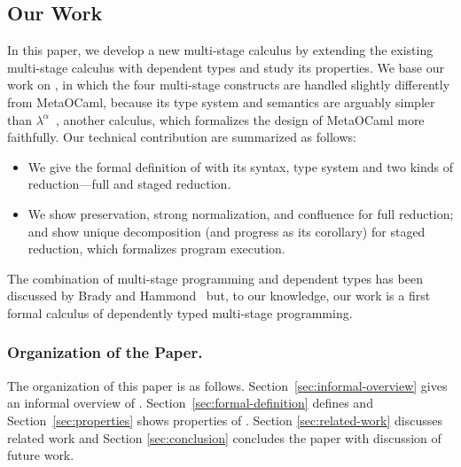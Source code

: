 \subsection{Our Work}
In this paper, we develop a new multi-stage calculus \LMD by extending
the existing multi-stage calculus \LTP\cite{Hanada2014} with dependent
types and study its properties.  We base our work on \LTP, in which
the four multi-stage constructs are handled slightly differently from
MetaOCaml, because its type system and semantics are arguably simpler
than \(\lambda^\alpha\)~\cite{taha2003environment}, another calculus,
which formalizes the design of MetaOCaml more faithfully.  Our
technical contribution are summarized as follows:
\begin{itemize}
\item We give the formal definition of \LMD with its syntax, 
  type system and two kinds of reduction---full and staged reduction.
\item We show preservation, strong normalization, and confluence for
  full reduction; and show unique decomposition (and progress as its
  corollary) for staged reduction, which formalizes program execution.
\end{itemize}
The combination of multi-stage programming and dependent types has
been discussed by Brady and Hammond~\cite{brady2006dependently} but,
to our knowledge, our work is a first formal calculus of dependently
typed multi-stage programming.


\subsubsection{Organization of the Paper.}

The organization of this paper is as follows.
Section~\ref{sec:informal-overview} gives an informal overview of
\LMD.  Section~\ref{sec:formal-definition} defines \LMD and
Section~\ref{sec:properties} shows properties of \LMD.  Section
\ref{sec:related-work} discusses related work and Section
\ref{sec:conclusion} concludes the paper with discussion of future
work.
